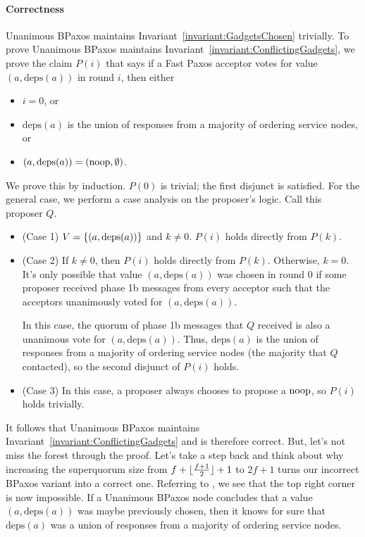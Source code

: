 \documentclass{mwhittaker}
\theoremstyle{definition}
\newcommand{\deps}[1]{\text{deps}(#1)}
\newcommand{\invref}[1]{Invariant~\ref{invariant:#1}}
\begin{document}
\paragraph{Correctness}
Unanimous BPaxos maintains \invref{GadgetsChosen} trivially. To prove Unanimous
BPaxos maintains \invref{ConflictingGadgets}, we prove the claim $P(i)$ that
says if a Fast Paxos acceptor votes for value $(a, \deps{a})$ in round $i$,
then either
\begin{itemize}
  \item
    $i = 0$, or
  \item
    $\deps{a}$ is the union of responses from a majority of ordering service
    nodes, or
  \item
    $(a, \deps{a}) = (\noop, \emptyset)$.
\end{itemize}
We prove this by induction. $P(0)$ is trivial; the first disjunct is satisfied.
For the general case, we perform a case analysis on the proposer's logic. Call
this proposer $Q$.
\begin{itemize}
  \item (Case 1)
    $V = \set{(a, \deps{a})}$ and $k \neq 0$. $P(i)$ holds directly from
    $P(k)$.

  \item (Case 2)
    If $k \neq 0$, then $P(i)$ holds directly from $P(k)$. Otherwise, $k = 0$.
    It's only possible that value $(a, \deps{a})$ was chosen in round $0$ if
    some proposer received phase 1b messages from every acceptor such that the
    acceptors unanimously voted for $(a, \deps{a})$.

    In this case, the quorum of phase 1b messages that $Q$ received is also a
    unanimous vote for $(a, \deps{a})$.  Thus, $\deps{a}$ is the union of
    responses from a majority of ordering service nodes (the majority that $Q$
    contacted), so the second disjunct of $P(i)$ holds.

  \item (Case 3)
    In this case, a proposer always chooses to propose a $\text{noop}$, so $P(i)$
    holds trivially.
\end{itemize}

It follows that Unanimous BPaxos maintains \invref{ConflictingGadgets} and is
therefore correct. But, let's not miss the forest through the proof. Let's take
a step back and think about why increasing the superquorum size from $f +
\lfloor\frac{f+1}{2}\rfloor + 1$ to $2f+1$ turns our incorrect BPaxos variant into a
correct one. Referring to , we see that the top right
corner is now impossible. If a Unanimous BPaxos node concludes that a value
$(a, \deps{a})$ was maybe previously chosen, then it knows for sure that
$\deps{a}$ was a union of responses from a majority of ordering service nodes.
\end{document}
